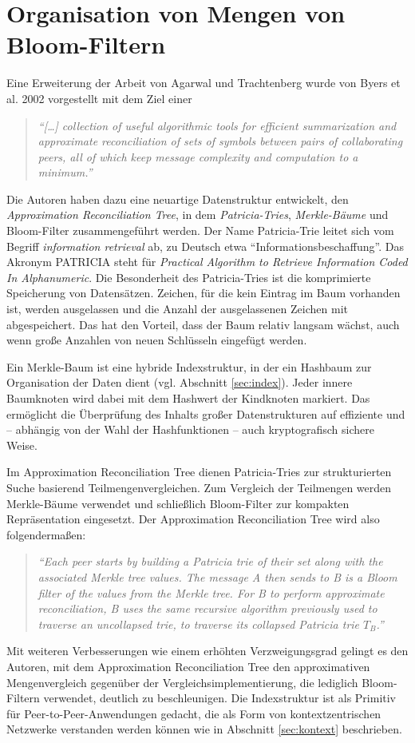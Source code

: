 \section{Organisation von Mengen von Bloom-Filtern}\label{sec:organisation}
Eine Erweiterung der Arbeit von Agarwal und Trachtenberg wurde von Byers et al. 2002 vorgestellt mit dem Ziel einer
\begin{quote}
\textit{"`[\dots] collection of useful algorithmic tools for efficient summarization and approximate reconciliation of sets of symbols between pairs of collaborating peers, all of which keep message complexity and computation to a minimum."'} \cite{Byers2002}
\end{quote}
Die Autoren haben dazu eine neuartige Datenstruktur entwickelt, den \textit{Approximation Reconciliation Tree}, in dem \textit{Patricia-Tries}, \textit{Merkle-Bäume} und Bloom-Filter zusammengeführt werden. Der Name Patricia-Trie leitet sich vom Begriff \textit{information retrieval} ab, zu Deutsch etwa "`Informationsbeschaffung"'. Das Akronym PATRICIA steht für \textit{Practical Algorithm to Retrieve Information Coded In Alphanumeric}. Die Besonderheit des Patricia-Tries ist die komprimierte Speicherung von Datensätzen. Zeichen, für die kein Eintrag im Baum vorhanden ist, werden ausgelassen und die Anzahl der ausgelassenen Zeichen mit abgespeichert. Das hat den Vorteil, dass der Baum relativ langsam wächst, auch wenn große Anzahlen von neuen Schlüsseln eingefügt werden. 

Ein Merkle-Baum ist eine hybride Indexstruktur, in der ein Hashbaum zur Organisation der Daten dient (vgl. Abschnitt \ref{sec:index}). Jeder innere Baumknoten wird dabei mit dem Hashwert der Kindknoten markiert. Das ermöglicht die Überprüfung des Inhalts großer Datenstrukturen auf effiziente und -- abhängig von der Wahl der Hashfunktionen -- auch kryptografisch sichere Weise. 

Im Approximation Reconciliation Tree dienen Patricia-Tries zur strukturierten Suche basierend Teilmengenvergleichen. Zum Vergleich der Teilmengen werden Merkle-Bäume verwendet und schließlich Bloom-Filter zur kompakten Repräsentation eingesetzt. Der Approximation Reconciliation Tree wird also folgendermaßen: 
\begin{quote}
\textit{"`Each peer starts by building a Patricia trie of their set along with the associated Merkle tree values. The message A then sends to B is a Bloom filter of the values from the Merkle tree. For B to perform approximate reconciliation, B uses the same recursive algorithm previously used to traverse an uncollapsed trie, to traverse its collapsed Patricia trie $T_B$."'} \cite{Byers2002}
\end{quote}
Mit weiteren Verbesserungen wie einem erhöhten Verzweigungsgrad gelingt es den Autoren, mit dem Approximation Reconciliation Tree den approximativen Mengenvergleich gegenüber der Vergleichsimplementierung, die lediglich Bloom-Filtern verwendet, deutlich zu beschleunigen. Die Indexstruktur ist als Primitiv für Peer-to-Peer-Anwendungen gedacht, die als Form von kontextzentrischen Netzwerke verstanden werden können wie in Abschnitt \ref{sec:kontext} beschrieben. 
